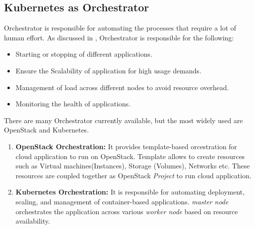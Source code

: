 \subsection{Kubernetes as Orchestrator}
\label{sec:k8s_orchestrator}
Orchestrator is responsible for automating the processes that require a lot of human effort. As discussed in \cite{containerjournal}, Orchestrator is responsible for the following:
\begin{itemize}
  \item Starting or stopping of different applications.
  \item Ensure the Scalability of application for high usage demands.
  \item Management of load across different nodes to avoid resource overhead.
  \item Monitoring the health of applications.
\end{itemize}
There are many Orchestrator currently available, but the most widely used are OpenStack and Kubernetes.
\begin{enumerate}
  \item \textbf{OpenStack Orchestration:} It provides template-based orcestration for cloud application to run on OpenStack. Template allows to create resources such as Virtual machines(Instances), Storage (Volumes), Networks etc. These resources are coupled together as OpenStack \emph{Project} to run cloud application\cite{openstackOrchestrator}.
  \item \textbf{Kubernetes Orchestration:} It is responsible for automating deployment, scaling, and management of container-based applications. \emph{master node} orchestrates the application across various \emph{worker node} based on resource availability.
\end{enumerate}
